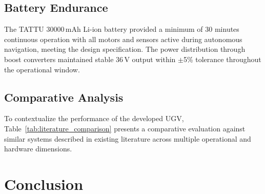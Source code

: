 \documentclass[conference]{IEEEtran}
\begin{document}
\subsection{Battery Endurance}

The TATTU 30000\,mAh Li-ion battery provided a minimum of 30 minutes continuous operation with all motors and sensors active during autonomous navigation, meeting the design specification. The power distribution through boost converters maintained stable 36\,V output within $\pm$5\% tolerance throughout the operational window.

\subsection{Comparative Analysis}

To contextualize the performance of the developed UGV, Table~\ref{tab:literature_comparison} presents a comparative evaluation against similar systems described in existing literature across multiple operational and hardware dimensions.

\begin{table}[htbp]
\caption{Performance Comparison with Existing Literature}
\label{tab:literature_comparison}
\centering
{}
\end{table}

\section{Conclusion}
\label{sec:conclusion}
\end{document}

